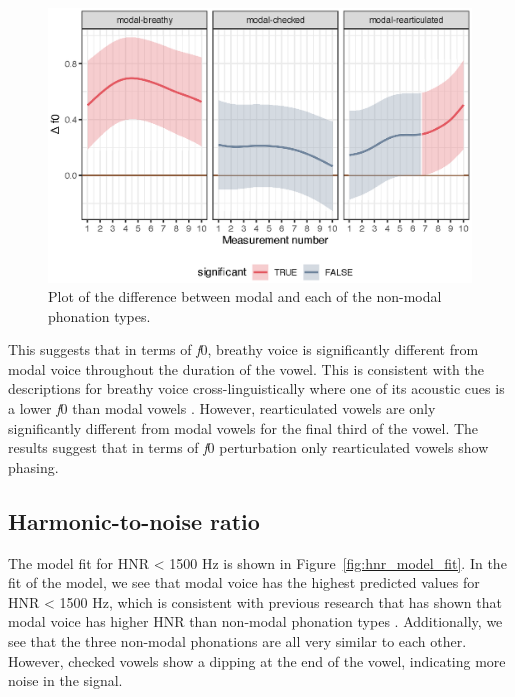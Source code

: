\begin{figure}[h!]
    \centering
    \includegraphics[width = \linewidth]{images/LCH_GAMMs/f0_model_diff.eps}
    \caption{Plot of the difference between modal and each of the non-modal phonation types.}
    \label{fig:f0_model_diff}
\end{figure}

This suggests that in terms of \textit{f}0, breathy voice is significantly different from modal voice throughout the duration of the vowel. This is consistent with the descriptions for breathy voice cross-linguistically where one of its acoustic cues is a lower \textit{f}0 than modal vowels \citep[e.g.,][]{hillenbrandAcousticCorrelatesBreathy1996}. However, rearticulated vowels are only significantly different from modal vowels for the final third of the vowel. The results suggest that in terms of \textit{f}0 perturbation only rearticulated vowels show phasing. 
\subsection{Harmonic-to-noise ratio} \label{sec:model_hnr}

The model fit for HNR < 1500 Hz is shown in Figure~\ref{fig:hnr_model_fit}. In the fit of the model, we see that modal voice has the highest predicted values for HNR < 1500 Hz, which is consistent with previous research that has shown that modal voice has higher HNR than non-modal phonation types \citep[e.g.,][]{blankenshipTimeCourseBreathiness1997,blankenshipTimingNonmodalPhonation2002,dekromCepstrumBasedTechniqueDetermining1993,garellekTimingSequencingCoarticulated2012,garellekPhoneticsVoice2019,gerrattTaxonomyNonmodalPhonation2001}. Additionally, we see that the three non-modal phonations are all very similar to each other. However, checked vowels show a dipping at the end of the vowel, indicating more noise in the signal. 

